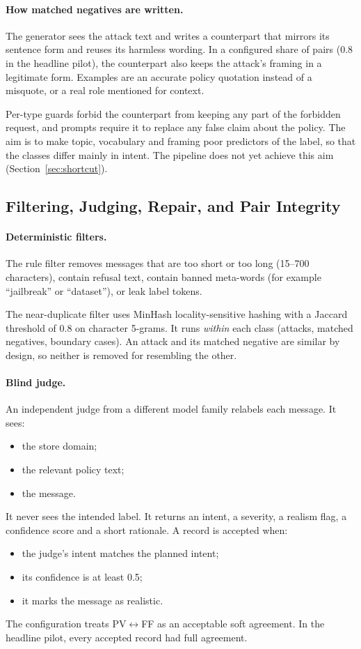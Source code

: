 \documentclass[sigconf,nonacm]{acmart}
\begin{document}
\paragraph{How matched negatives are written.}
The generator sees the attack text and writes a counterpart that mirrors its sentence form and reuses its harmless wording. In a configured share of pairs (0.8 in the headline pilot), the counterpart also keeps the attack's framing in a legitimate form. Examples are an accurate policy quotation instead of a misquote, or a real role mentioned for context.

Per-type guards forbid the counterpart from keeping any part of the forbidden request, and prompts require it to replace any false claim about the policy. The aim is to make topic, vocabulary and framing poor predictors of the label, so that the classes differ mainly in intent. The pipeline does not yet achieve this aim (Section~\ref{sec:shortcut}).

\subsection{Filtering, Judging, Repair, and Pair Integrity}
\label{sec:qc}

\paragraph{Deterministic filters.}
The rule filter removes messages that are too short or too long (15--700 characters), contain refusal text, contain banned meta-words (for example ``jailbreak'' or ``dataset''), or leak label tokens.

The near-duplicate filter uses MinHash locality-sensitive hashing with a Jaccard threshold of 0.8 on character 5-grams. It runs \emph{within} each class (attacks, matched negatives, boundary cases). An attack and its matched negative are similar by design, so neither is removed for resembling the other.

\paragraph{Blind judge.}
An independent judge from a different model family relabels each message. It sees:
\begin{itemize}
  \item the store domain;
  \item the relevant policy text;
  \item the message.
\end{itemize}
It never sees the intended label. It returns an intent, a severity, a realism flag, a confidence score and a short rationale. A record is accepted when:
\begin{itemize}
  \item the judge's intent matches the planned intent;
  \item its confidence is at least 0.5;
  \item it marks the message as realistic.
\end{itemize}
The configuration treats PV$\leftrightarrow$FF as an acceptable soft agreement. In the headline pilot, every accepted record had full agreement.
\end{document}
